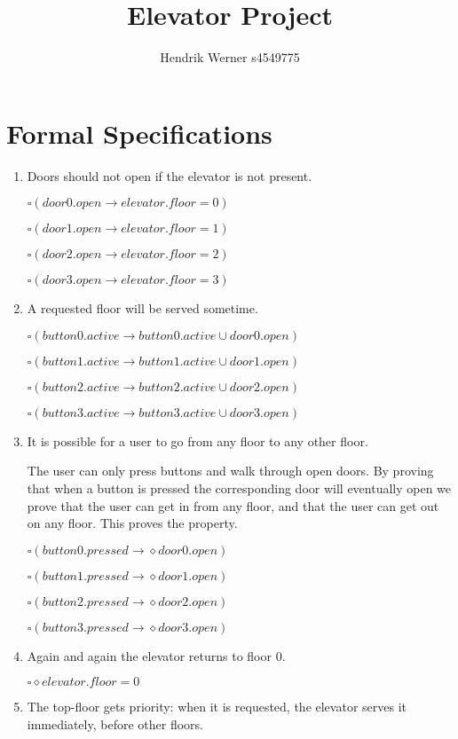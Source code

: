 \documentclass[12pt, a4paper]{article}
\title{Elevator Project}
\author{Hendrik Werner s4549775}
\begin{document}
\maketitle

\section{Formal Specifications}
\begin{enumerate}
	\item %
	Doors should not open if the elevator is not present.

	$\square (door0.open \rightarrow elevator.floor = 0)$

	$\square (door1.open \rightarrow elevator.floor = 1)$

	$\square (door2.open \rightarrow elevator.floor = 2)$

	$\square (door3.open \rightarrow elevator.floor = 3)$
	\item %
	A requested floor will be served sometime.

	$\square (button0.active \rightarrow button0.active \cup door0.open)$

	$\square (button1.active \rightarrow button1.active \cup door1.open)$

	$\square (button2.active \rightarrow button2.active \cup door2.open)$

	$\square (button3.active \rightarrow button3.active \cup door3.open)$
	\item %
	It is possible for a user to go from any floor to any other floor.

	The user can only press buttons and walk through open doors. By proving that when a button is pressed the corresponding door will eventually open we prove that the user can get in from any floor, and that the user can get out on any floor. This proves the property.

	$\square (button0.pressed \rightarrow \diamond door0.open)$

	$\square (button1.pressed \rightarrow \diamond door1.open)$

	$\square (button2.pressed \rightarrow \diamond door2.open)$

	$\square (button3.pressed \rightarrow \diamond door3.open)$
	\item %
	Again and again the elevator returns to floor 0.

	$\square \diamond elevator.floor = 0$
	\item %
	The top-floor gets priority: when it is requested, the elevator serves it immediately, before other floors.


\end{enumerate}
\end{document}
